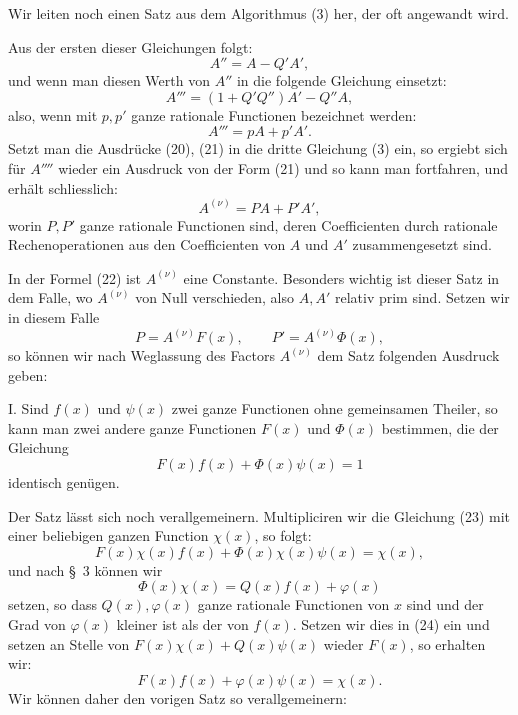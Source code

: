 \documentclass[11pt]{article}
\begin{document}
Wir leiten noch einen Satz aus dem Algorithmus (3) her, der oft angewandt wird.

Aus der ersten dieser Gleichungen folgt:
\begin{equation}
 A''=A-Q'A',
\tag{20}
\end{equation}
und wenn man diesen Werth von $A''$ in die folgende Gleichung einsetzt:
\[
 A'''=(1+Q'Q'')A'-Q''A,
\]
also, wenn mit $p,p'$ ganze rationale Functionen bezeichnet werden:
\begin{equation}
 A'''=pA+p'A'.
\tag{21}
\end{equation}
Setzt man die Ausdrücke (20), (21) in die dritte Gleichung (3) ein, so ergiebt sich für $A''''$ wieder ein Ausdruck von der Form (21) und so kann man fortfahren, und erhält schliesslich:
\begin{equation}
 A^{(\nu)}=PA+P'A',
\tag{22}
\end{equation}
worin $P,P'$ ganze rationale Functionen sind, deren Coefficienten durch rationale Rechenoperationen aus den Coefficienten von $A$ und $A'$ zusammengesetzt sind.

In der Formel (22) ist $A^{(\nu)}$ eine Constante. Besonders wichtig ist dieser Satz in dem Falle, wo $A^{(\nu)}$ von Null verschieden, also $A,A'$ relativ prim sind. Setzen wir in diesem Falle
\[
 P=A^{(\nu)}F(x),\qquad P'=A^{(\nu)}\Phi(x),
\]
so können wir nach Weglassung des Factors $A^{(\nu)}$ dem Satz folgenden Ausdruck geben:

I. Sind $f(x)$ und $\psi(x)$ zwei ganze Functionen ohne gemeinsamen Theiler, so kann man zwei andere ganze Functionen $F(x)$ und $\Phi(x)$ bestimmen, die der Gleichung
\begin{equation}
 F(x)f(x)+\Phi(x)\psi(x)=1
\tag{23}
\end{equation}
identisch genügen.

Der Satz lässt sich noch verallgemeinern. Multipliciren wir die Gleichung (23) mit einer beliebigen ganzen Function $\chi(x)$, so folgt:
\begin{equation}
 F(x)\chi(x)f(x)+\Phi(x)\chi(x)\psi(x)=\chi(x),
\tag{24}
\end{equation}
und nach \S~3 können wir
\begin{equation}
 \Phi(x)\chi(x)=Q(x)f(x)+\varphi(x)
\tag{25}
\end{equation}
setzen, so dass $Q(x),\varphi(x)$ ganze rationale Functionen von $x$ sind und der Grad von $\varphi(x)$ kleiner ist als der von $f(x)$. Setzen wir dies in (24) ein und setzen an Stelle von $F(x)\chi(x)+Q(x)\psi(x)$ wieder $F(x)$, so erhalten wir:
\[
 F(x)f(x)+\varphi(x)\psi(x)=\chi(x).
\]
Wir können daher den vorigen Satz so verallgemeinern:
\end{document}
